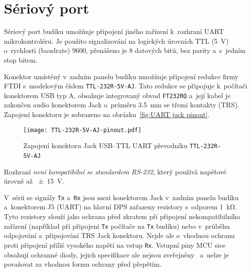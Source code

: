 \section{Sériový port}
Sériový port budíku umožňuje připojení jiného zařízení k~rozhraní \acs{UART}
mikrokontroléru. Je použito signalizování na logických úrovních \acs{TTL}
(\SI{5}{\volt}) o~rychlosti (\foreignlanguage{english}{baudrate})
\SI{9600}{\baud}, přenášeno je \num{8} datových bitů, bez parity a~s~jedním
stop bitem.

Konektor umístěný v~zadním panelu budíku umožňuje připojení redukce firmy FTDI
s~modelovým číslem \texttt{TTL-232R-5V-AJ}. Tato redukce se připojuje
k~počítači konektorem USB typ A, obsahuje integrovaný obvod \texttt{FT232RQ}
a~její kabel je zakončen audio konektorem Jack o~průměru \SI{3,5}{\milli\meter}
se třemi kontakty (TRS). Zapojení konektoru je zobrazeno na
obrázku~\vref{fig:UART jack pinout}.

\begin{figure}[htbp]
    \centering
    \texttt{[image: TTL-232R-5V-AJ-pinout.pdf]}
    \caption{%
        Zapojení konektoru Jack USB--TTL UART převodníku
        \texttt{TTL-232R-5V-AJ}~\cite{TTL-232R}
    }
    \label{fig:UART jack pinout}
\end{figure}

Rozhraní \emph{není kompatibilní se standardem RS-232}, který používá napěťové
úrovně až \SI{\pm15}{\volt}.

V~sérii se signály \texttt{Tx} a~\texttt{Rx} jsou mezi konektorem Jack v~zadním
panelu budíku a~konektorem J5 (UART) na hlavní DPS zařazeny rezistory s~odporem
\SI{1}{\kilo\ohm}. Tyto rezistory slouží jako ochrana před zkratem při
připojení nekompatibilního zařízení (například při připojení \texttt{Tx}
počítače na \texttt{Tx} budíku) nebo v~průběhu odpojování a~připojování TRS
Jack konektoru. Nejde ale o~vhodnou ochranu proti připojení příliš vysokého
napětí na vstup \texttt{Rx}. Vstupní piny \acs{MCU} sice obsahují ochranné
diody, jejich specifikace ale nejsou zveřejněny~\cite{dshATmega328} a~nelze je
považovat za vhodnou formu ochrany před přepětím.
